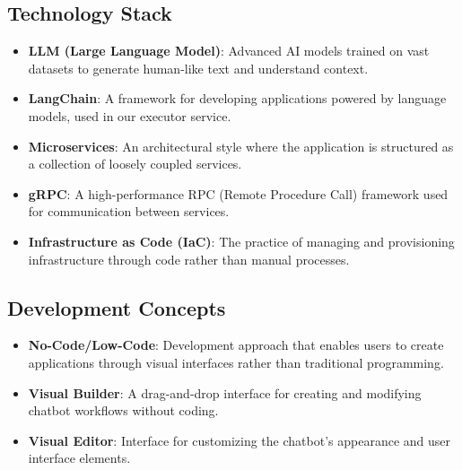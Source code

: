 \subsection{Technology Stack}
\begin{itemize}
    \item \textbf{LLM (Large Language Model)}: Advanced AI models trained on vast datasets to generate human-like text and understand context.
    
    \item \textbf{LangChain}: A framework for developing applications powered by language models, used in our executor service.
    
    \item \textbf{Microservices}: An architectural style where the application is structured as a collection of loosely coupled services.
    
    \item \textbf{gRPC}: A high-performance RPC (Remote Procedure Call) framework used for communication between services.
    
    \item \textbf{Infrastructure as Code (IaC)}: The practice of managing and provisioning infrastructure through code rather than manual processes.
\end{itemize}

\subsection{Development Concepts}
\begin{itemize}
    \item \textbf{No-Code/Low-Code}: Development approach that enables users to create applications through visual interfaces rather than traditional programming.
    
    \item \textbf{Visual Builder}: A drag-and-drop interface for creating and modifying chatbot workflows without coding.
    
    \item \textbf{Visual Editor}: Interface for customizing the chatbot's appearance and user interface elements.
\end{itemize}

